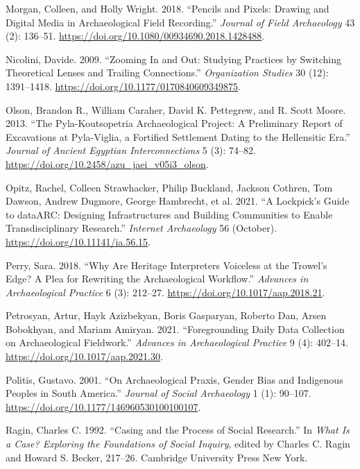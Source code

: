 \documentclass[
]{article}
\newlength{\cslhangindent}
\newenvironment{CSLReferences}[2] %
 {\begin{list}{}{%
  \setlength{\itemindent}{0pt}
  \setlength{\leftmargin}{0pt}
  \setlength{\parsep}{0pt}
  \ifodd #1
   \setlength{\leftmargin}{\cslhangindent}
   \setlength{\itemindent}{-1\cslhangindent}
  \fi
  \setlength{\itemsep}{#2\baselineskip}}}
 {\end{list}}
\begin{document}
\begin{CSLReferences}{1}{0}
Morgan, Colleen, and Holly Wright. 2018. {``Pencils and {Pixels}:
{Drawing} and {Digital Media} in {Archaeological Field Recording}.''}
\emph{Journal of Field Archaeology} 43 (2): 136--51.
\url{https://doi.org/10.1080/00934690.2018.1428488}.

Nicolini, Davide. 2009. {``Zooming {In} and {Out}: {Studying Practices}
by {Switching Theoretical Lenses} and {Trailing Connections}.''}
\emph{Organization Studies} 30 (12): 1391--1418.
\url{https://doi.org/10.1177/0170840609349875}.

Olson, Brandon R., William Caraher, David K. Pettegrew, and R. Scott
Moore. 2013. {``The {Pyla-Koutsopetria Archaeological Project}: {A
Preliminary Report} of {Excavations} at {Pyla-Viglia}, a {Fortified
Settlement Dating} to the {Hellensitic Era}.''} \emph{Journal of Ancient
Egyptian Interconnections} 5 (3): 74--82.
\url{https://doi.org/10.2458/azu_jaei_v05i3_olson}.

Opitz, Rachel, Colleen Strawhacker, Philip Buckland, Jackson Cothren,
Tom Dawson, Andrew Dugmore, George Hambrecht, et al. 2021. {``A
{Lockpick}'s {Guide} to {dataARC}: {Designing Infrastructures} and
{Building Communities} to {Enable Transdisciplinary Research}.''}
\emph{Internet Archaeology} 56 (October).
\url{https://doi.org/10.11141/ia.56.15}.

Perry, Sara. 2018. {``Why {Are Heritage Interpreters Voiceless} at the
{Trowel}'s {Edge}? {A Plea} for {Rewriting} the {Archaeological
Workflow}.''} \emph{Advances in Archaeological Practice} 6 (3): 212--27.
\url{https://doi.org/10.1017/aap.2018.21}.

Petrosyan, Artur, Hayk Azizbekyan, Boris Gasparyan, Roberto Dan, Arsen
Bobokhyan, and Mariam Amiryan. 2021. {``Foregrounding {Daily Data
Collection} on {Archaeological Fieldwork}.''} \emph{Advances in
Archaeological Practice} 9 (4): 402--14.
\url{https://doi.org/10.1017/aap.2021.30}.

Politis, Gustavo. 2001. {``On Archaeological Praxis, Gender Bias and
Indigenous Peoples in {South America}.''} \emph{Journal of Social
Archaeology} 1 (1): 90--107.
\url{https://doi.org/10.1177/146960530100100107}.

Ragin, Charles C. 1992. {``Casing and the Process of Social Research.''}
In \emph{What Is a {Case}? {Exploring} the {Foundations} of {Social
Inquiry}}, edited by Charles C. Ragin and Howard S. Becker, 217--26.
Cambridge University Press New York.


\end{CSLReferences}
\end{document}
